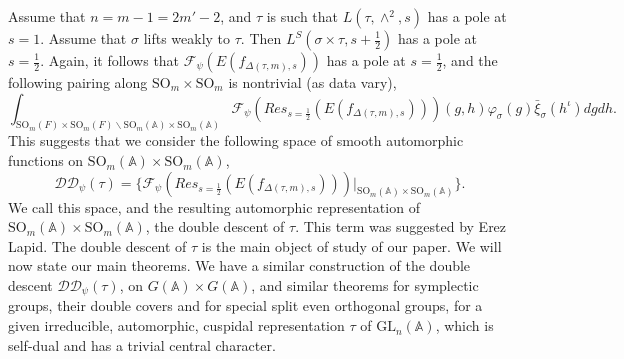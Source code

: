 \documentclass[12pts]{amsart}
\newcommand{\BA}{{\mathbb {A}}}
\newcommand{\GL}{{\mathrm{GL}}}
\newcommand{\SO}{{\mathrm{SO}}}
\begin{document}
Assume that $n=m-1=2m'-2$, and $\tau$ is such that $L(\tau,\wedge^2,s)$ has a pole at $s=1$. Assume that $\sigma$ lifts weakly to $\tau$. Then $L^S(\sigma\times \tau, s+\frac{1}{2})$ has a pole at $s=\frac{1}{2}$. Again, it follows that $\mathcal{F}_\psi(E(f_{\Delta(\tau,
	m),s}))$ has a pole at $s=\frac{1}{2}$, and the following pairing along 
$\SO_m\times \SO_m$ is nontrivial (as data vary),
\begin{equation}\label{0.5}
\int_{\SO_m(F)\times \SO_m(F)\backslash
	\SO_m(\BA)\times \SO_m(\BA)}\mathcal{F}_\psi(Res_{s=\frac{1}{2}}(E(f_{\Delta(\tau,
	m),s})))(g,h)\varphi_\sigma(g)\bar{\xi}_\sigma(h^\iota)dgdh.
\end{equation}
This suggests that we consider the following space of smooth automorphic functions on $\SO_m(\BA)\times \SO_m(\BA)$,
\begin{equation}\label{0.6}
\mathcal{D}\mathcal{D}_\psi(\tau)=\{\mathcal{F}_\psi(Res_{s=\frac{1}{2}}(E(f_{\Delta(\tau,
	m),s})))\Big|_{\SO_m(\BA)\times \SO_m(\BA)}\}.
\end{equation}
We call this space, and the resulting automorphic representation of $\SO_m(\BA)\times \SO_m(\BA)$, the double descent of $\tau$. This term was suggested by Erez Lapid. The double descent of $\tau$ is the main object of study of our paper. We will now state our main theorems. We have a similar construction of the double descent
$\mathcal{D}\mathcal{D}_\psi(\tau)$, on $G(\BA)\times G(\BA)$, and similar theorems for symplectic groups, their double covers and for special split even orthogonal groups, for a given irreducible, automorphic, cuspidal representation $\tau$ of $\GL_n(\BA)$, which is self-dual and has a trivial central character.
\end{document}
